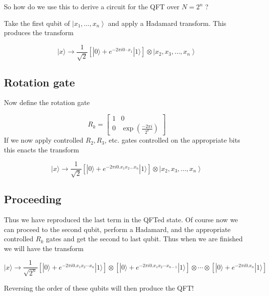 \documentclass[%
oneside,                 %
final,                   %
10pt]{article}
\begin{document}
So how do we use this to derive a circuit for the QFT over $N=2^{n}$ ?

Take the first qubit of $\left|x_{1}, \ldots, x_{n}\right\rangle$ and
apply a Hadamard transform. This produces the transform

\begin{equation*}
|x\rangle \rightarrow \frac{1}{\sqrt{2}}\left[|0\rangle+e^{-2 \pi i 0 \cdot x_{1}}|1\rangle\right] \otimes\left|x_{2}, x_{3}, \ldots, x_{n}\right\rangle 
\end{equation*}

\subsection{Rotation gate}
Now define the rotation gate

\[
R_{k}=\left[\begin{array}{cc}
1 & 0  \tag{30}\\
0 & \exp \left(\frac{-2 \pi i}{2^{k}}\right)
\end{array}\right]
\]
If we now apply controlled $R_{2}, R_{3}$, etc. gates controlled on
the appropriate bits this enacts the transform

\begin{equation*}
|x\rangle \rightarrow \frac{1}{\sqrt{2}}\left[|0\rangle+e^{-2 \pi i 0 . x_{1} x_{2} \ldots x_{n}}|1\rangle\right] \otimes\left|x_{2}, x_{3}, \ldots, x_{n}\right\rangle 
\end{equation*}

\subsection{Proceeding}

Thus we have reproduced the last term in the QFTed state. Of course
now we can proceed to the second qubit, perform a Hadamard, and the
appropriate controlled $R_{k}$ gates and get the second to last
qubit. Thus when we are finished we will have the transform

\begin{equation*}
|x\rangle \rightarrow \frac{1}{\sqrt{2^{n}}}\left[|0\rangle+e^{-2 \pi i 0 . x_{1} x_{2} \cdots x_{n}}|1\rangle\right] \otimes\left[|0\rangle+e^{-2 \pi i 0 . x_{1} x_{2} \cdots x_{n-1}}|1\rangle\right] \otimes \cdots \otimes\left[|0\rangle+e^{-2 \pi i 0 . x_{n}}|1\rangle\right]
\end{equation*}

Reversing the order of these qubits will then produce the QFT!
\end{document}
